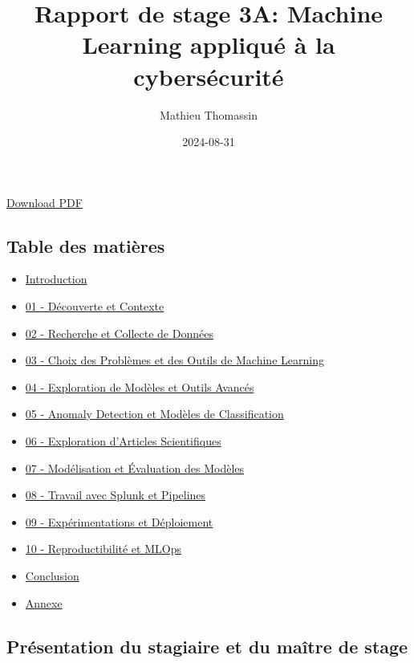 \documentclass[
  letterpaper,
  DIV=11,
  numbers=noendperiod]{scrartcl}
\title{Rapport de stage 3A: Machine Learning appliqué à la
cybersécurité}
\author{Mathieu Thomassin}
\date{2024-08-31}
\providecommand{\tightlist}{%
  \setlength{\itemsep}{0pt}\setlength{\parskip}{0pt}}\usepackage{longtable,booktabs,array}
\begin{document}
\maketitle


\href{index.pdf}{Download PDF}

\subsection{Table des matières}\label{table-des-matiuxe8res}

\begin{itemize}
\tightlist
\item
  \hyperref[introduction]{Introduction}
\item
  \hyperref[duxe9couverte-et-contexte]{01 - Découverte et Contexte}
\item
  \hyperref[recherche-et-collecte-de-donnuxe9es]{02 - Recherche et
  Collecte de Données}
\item
  \hyperref[choix-des-probluxe8mes-et-des-outils-de-machine-learning]{03
  - Choix des Problèmes et des Outils de Machine Learning}
\item
  \hyperref[exploration-de-moduxe8les-et-outils-avancuxe9s]{04 -
  Exploration de Modèles et Outils Avancés}
\item
  \hyperref[anomaly-detection-et-moduxe8les-de-classification]{05 -
  Anomaly Detection et Modèles de Classification}
\item
  \hyperref[exploration-darticles-scientifiques]{06 - Exploration
  d'Articles Scientifiques}
\item
  \hyperref[moduxe9lisation-et-uxe9valuation-des-moduxe8les]{07 -
  Modélisation et Évaluation des Modèles}
\item
  \hyperref[travail-avec-splunk-et-pipelines]{08 - Travail avec Splunk
  et Pipelines}
\item
  \hyperref[expuxe9rimentations-et-duxe9ploiement]{09 - Expérimentations
  et Déploiement}
\item
  \hyperref[reproductibilituxe9-et-mlops]{10 - Reproductibilité et
  MLOps}
\item
  \hyperref[conclusion]{Conclusion}
\item
  \hyperref[annexe]{Annexe}
\end{itemize}

\subsection{Présentation du stagiaire et du maître de
stage}\label{pruxe9sentation-du-stagiaire-et-du-mauxeetre-de-stage}
\end{document}
